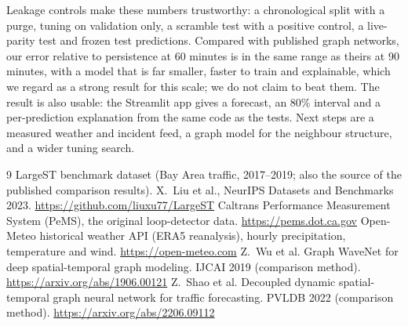 ﻿\documentclass[11pt,a4paper]{article}
\begin{document}
Leakage controls make these numbers trustworthy: a chronological split with a purge, tuning on validation only, a scramble test with a positive control, a live-parity test and frozen test predictions. Compared with published graph networks, our error relative to persistence at 60 minutes is in the same range as theirs at 90 minutes, with a model that is far smaller, faster to train and explainable, which we regard as a strong result for this scale; we do not claim to beat them.
The result is also usable: the Streamlit app gives a forecast, an 80\% interval and a per-prediction explanation from the same code as the tests. Next steps are a measured weather and incident feed, a graph model for the neighbour structure, and a wider tuning search.

\begin{thebibliography}{9}\scriptsize\setlength{\itemsep}{0pt}\setlength{\parskip}{0pt}
 LargeST benchmark dataset (Bay Area traffic, 2017--2019; also the source of the published comparison results). X.~Liu et al., NeurIPS Datasets and Benchmarks 2023. \url{https://github.com/liuxu77/LargeST}
 Caltrans Performance Measurement System (PeMS), the original loop-detector data. \url{https://pems.dot.ca.gov}
 Open-Meteo historical weather API (ERA5 reanalysis), hourly precipitation, temperature and wind. \url{https://open-meteo.com}
 Z.~Wu et al. Graph WaveNet for deep spatial-temporal graph modeling. IJCAI 2019 (comparison method). \url{https://arxiv.org/abs/1906.00121}
 Z.~Shao et al. Decoupled dynamic spatial-temporal graph neural network for traffic forecasting. PVLDB 2022 (comparison method). \url{https://arxiv.org/abs/2206.09112}
\end{thebibliography}
\end{document}
